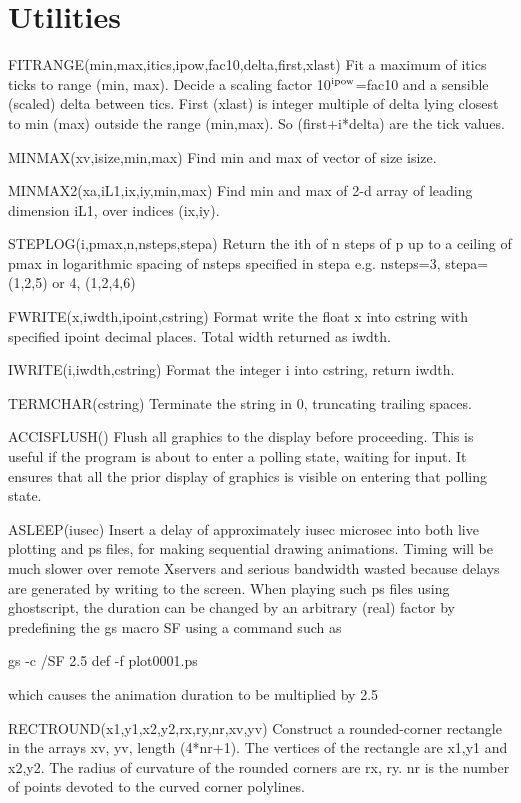 \documentclass[12pt]{article}
\begin{document}
\section{Utilities}

FITRANGE(min,max,itics,ipow,fac10,delta,first,xlast) Fit a maximum of
itics ticks to range (min, max). Decide a scaling factor 10$^{\rm
ipow}$=fac10 and a sensible (scaled) delta between tics. First (xlast)
is integer multiple of delta lying closest to min (max) outside the
range (min,max). So (first+i*delta) are the tick values.

MINMAX(xv,isize,min,max) Find min and max of vector of size isize.

MINMAX2(xa,iL1,ix,iy,min,max) Find min and max of 2-d array of
leading dimension iL1, over indices (ix,iy).

STEPLOG(i,pmax,n,nsteps,stepa) Return the ith of n steps of p up to a
ceiling of pmax in logarithmic spacing of nsteps specified in stepa
e.g. nsteps=3, stepa=(1,2,5) or 4, (1,2,4,6)


FWRITE(x,iwdth,ipoint,cstring) Format write the float x into cstring
with specified ipoint decimal places. Total width returned as iwdth.

IWRITE(i,iwdth,cstring) Format the integer i into cstring, return iwdth.

TERMCHAR(cstring) Terminate the string in 0, truncating trailing spaces.

ACCISFLUSH() Flush all graphics to the display before proceeding. This
is useful if the program is about to enter a polling state, waiting
for input. It ensures that all the prior display of graphics is visible on
entering that polling state.

ASLEEP(iusec) Insert a delay of approximately iusec microsec into both
live plotting and ps files, for making sequential drawing animations.
Timing will be much slower over remote Xservers and serious bandwidth
wasted because delays are generated by writing to the screen. When
playing such ps files using ghostscript, the duration can be changed
by an arbitrary (real) factor by predefining the gs macro SF using a
command such as

gs -c /SF 2.5 def -f plot0001.ps

which causes the animation duration to be multiplied by 2.5

RECTROUND(x1,y1,x2,y2,rx,ry,nr,xv,yv) Construct a rounded-corner
rectangle in the arrays xv, yv, length (4*nr+1). The vertices of the
rectangle are x1,y1 and x2,y2. The radius of curvature of the rounded
corners are rx, ry. nr is the number of points devoted to the curved
corner polylines.
\end{document}
